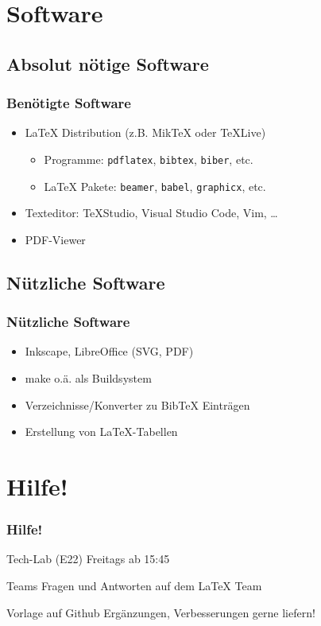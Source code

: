 \documentclass{beamer}
\begin{document}
\section{Software}
\subsection{Absolut nötige Software}
\begin{frame}
	\frametitle{Benötigte Software}
	\begin{itemize}
		\item \LaTeX{} Distribution (z.B. MikTeX oder TeXLive)
			\begin{itemize}
				\item Programme: {\tt pdflatex}, {\tt bibtex}, {\tt biber}, etc.
				\item \LaTeX{} Pakete: {\tt beamer}, {\tt babel}, {\tt graphicx}, etc.
			\end{itemize}
		\item Texteditor: TeXStudio, Visual Studio Code, Vim, \ldots
		\item PDF-Viewer
	\end{itemize}
\end{frame}

\subsection{Nützliche Software}
\begin{frame}
	\frametitle{Nützliche Software}
	\begin{itemize}
		\item Inkscape, LibreOffice (SVG, PDF)
		\item make o.ä. als Buildsystem
		\item Verzeichnisse/Konverter zu Bib\TeX{} Einträgen
		\item Erstellung von \LaTeX{}-Tabellen
	\end{itemize}
\end{frame}



\section{Hilfe!}
\begin{frame}
	\frametitle{Hilfe!}
	\begin{block}{Tech-Lab (E22)}
		Freitags ab 15:45 
	\end{block}
	\begin{block}{Teams}
		Fragen und Antworten auf dem \LaTeX{} Team
	\end{block}
	\begin{block}{Vorlage auf Github}
		Ergänzungen, Verbesserungen gerne liefern!
	\end{block}
\end{frame}
\end{document}

